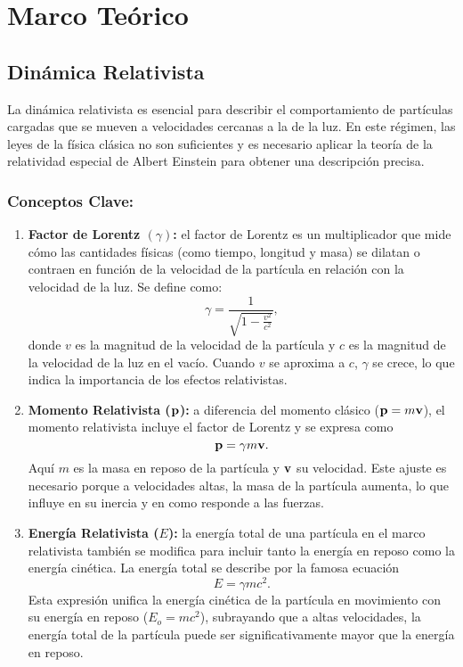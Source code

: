



\section{Marco Teórico}

\subsection{Dinámica Relativista}

La dinámica relativista es esencial para describir el comportamiento de partículas cargadas que se mueven a velocidades cercanas a la de la luz. En este régimen, las leyes de la física clásica no son suficientes y es necesario aplicar la teoría de la relatividad especial de Albert Einstein para obtener una descripción precisa.

\subsubsection*{Conceptos Clave: }

\begin{enumerate}
    \item \textbf{Factor de Lorentz $(\gamma)$:} el factor de Lorentz es un multiplicador que mide cómo las cantidades físicas (como tiempo, longitud y masa) se dilatan o contraen en función de la velocidad de la partícula en relación con la velocidad de la luz. Se define como:
        \begin{equation}
            \gamma = \frac{1}{\sqrt{1 - \frac{v^2}{c^2}}}, \label{factLorentz}
        \end{equation}
    donde $v$ es la magnitud de la velocidad de la partícula y $c$ es la magnitud de la velocidad de la luz en el vacío. Cuando $v$ se aproxima a $c$, $\gamma$ se crece, lo que indica la importancia de los efectos relativistas.
    \item \textbf{Momento Relativista ($\vb{p}$): } a diferencia del momento clásico ($\vb{p} = m\vb{v}$), el momento relativista incluye el factor de Lorentz y se expresa como
        \begin{equation}
            \vb{p} = \gamma m\vb{v}. \label{momentum}
        \end{equation}
    Aquí $m$ es la masa en reposo de la partícula y $\vb{v}$ su velocidad. Este ajuste es necesario porque a velocidades altas, la masa de la partícula aumenta, lo que influye en su inercia y en como responde a las fuerzas.
    \item \textbf{Energía Relativista ($E$): } la energía total de una partícula en el marco relativista también se modifica para incluir tanto la energía en reposo como la energía cinética. La energía total se describe por la famosa ecuación
        \begin{equation}
            E = \gamma mc^2 . \label{energia}
        \end{equation}
    Esta expresión unifica la energía cinética de la partícula en movimiento con su energía en reposo ($E_o = mc^2$), subrayando que a altas velocidades, la energía total de la partícula puede ser significativamente mayor que la energía en reposo.
\end{enumerate}

